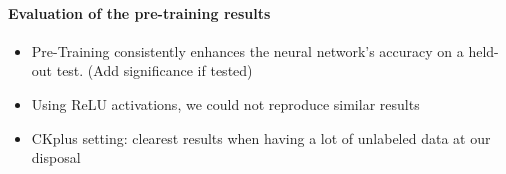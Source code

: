 \documentclass{article}
\begin{document}
  \paragraph{Evaluation of the pre-training results}
  \begin{itemize}
    \item Pre-Training consistently enhances the neural network's accuracy on a held-out test. (Add significance if tested)
    \item Using ReLU activations, we could not reproduce similar results
    \item CKplus setting: clearest results when having a lot of unlabeled data at our disposal
  \end{itemize}

\clearpage

\end{document}
